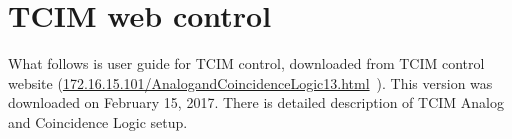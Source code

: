 \appendix
\chapter{TCIM web control}
\label{TCIMappend}
What follows is user guide for TCIM control, downloaded from TCIM control website (\url{172.16.15.101/AnalogandCoincidenceLogic13.html}~\cite{tcim}). This version was downloaded on February 15, 2017. There is detailed description of TCIM Analog and Coincidence Logic setup.

